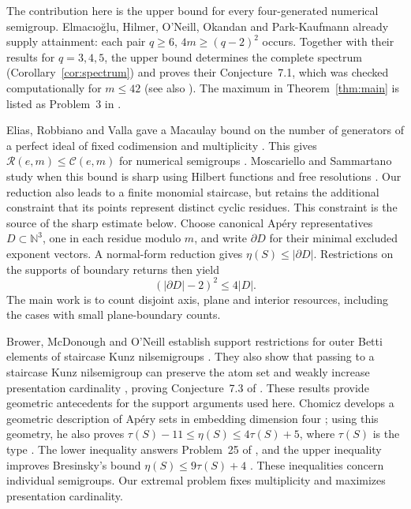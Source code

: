 \documentclass[11pt]{article}
\theoremstyle{definition}
\theoremstyle{remark}
\theoremstyle{plain}
\begin{document}
The contribution here is the upper bound for every four-generated
numerical semigroup. Elmac\i{}o\u{g}lu, Hilmer, O'Neill, Okandan and
Park-Kaufmann \cite[Theorem~6.3]{EHOOPK24} already supply attainment:
each pair $q\ge6$, $4m\ge(q-2)^2$ occurs. Together with their results
for $q=3,4,5$, the upper bound determines the complete spectrum
(Corollary~\ref{cor:spectrum}) and proves their Conjecture~7.1, which was
checked computationally for $m\le42$
\cite[Section~7]{EHOOPK24} (see also \cite[Section~5]{BMO25}).
The maximum in Theorem~\ref{thm:main} is listed as Problem~3 in
\cite{MSSurvey25}.

Elias, Robbiano and Valla gave a Macaulay bound on the number of generators
of a perfect ideal of fixed codimension and multiplicity
\cite[Theorem~5.1]{ERV91}. This gives $\mathcal R(e,m)\le\mathcal C(e,m)$
for numerical semigroups \cite[Section~1]{MS25}. Moscariello and Sammartano
study when this bound is sharp using Hilbert functions and free resolutions
\cite[Sections~2 and~4]{MS25}.
Our reduction also leads to a finite monomial staircase, but retains
the additional constraint that its points represent distinct cyclic
residues. This constraint is the source of the sharp estimate below.
Choose canonical Ap\'ery representatives $D\subset\mathbb N^3$, one
in each residue modulo $m$, and write $\partial D$ for their minimal
excluded exponent vectors. A normal-form reduction gives
$\eta(S)\le|\partial D|$. Restrictions on the supports of boundary returns then
yield
\[
 (|\partial D|-2)^2\le4|D|.
\]
The main work is to count disjoint axis, plane and interior resources,
including the cases with small plane-boundary counts.

Brower, McDonough and O'Neill establish support restrictions for outer
Betti elements of staircase Kunz nilsemigroups
\cite[Proposition~5.2]{BMO25}. They also show that passing to a staircase
Kunz nilsemigroup can preserve the atom set and weakly increase
presentation cardinality \cite[Theorem~6.2]{BMO25}, proving
Conjecture~7.3 of \cite{EHOOPK24}. These results provide geometric
antecedents for the support arguments used here. Chomicz develops a geometric
description of Ap\'ery sets in embedding dimension four
\cite[Section~2.2]{Chomicz26A}; using this geometry, he also proves
$\tau(S)-11\le\eta(S)\le4\tau(S)+5$, where $\tau(S)$ is the type
\cite[Theorem~1.4]{Chomicz26B}. The lower inequality answers Problem~25
of \cite{MSSurvey25}, and the upper inequality improves Bresinsky's
bound $\eta(S)\le9\tau(S)+4$ \cite[Theorem~7]{Bresinsky88}.
These inequalities concern individual semigroups. Our extremal problem
fixes multiplicity and maximizes presentation cardinality.
\end{document}
